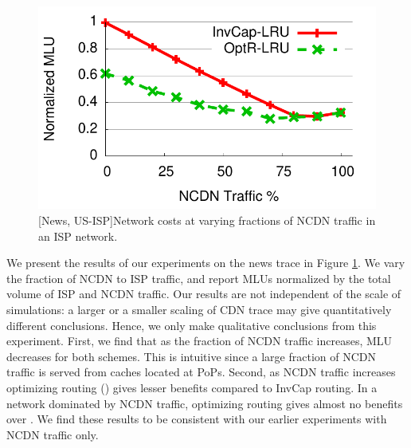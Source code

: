 \begin{figure}
\begin{center}
\includegraphics[scale=0.4]{graphset1/ispncdn/ATTNews-99percentile.pdf}
\vspace{-0.25in}
\end{center}
\caption{[News, US-ISP]Network costs at varying fractions of NCDN traffic in an ISP network.}
\label{fig:ispncdn}
\vspace{-0.2in}
\end{figure}

We present the results of our experiments on the news trace in Figure \ref{fig:ispncdn}. We vary the fraction of NCDN to ISP traffic, and report MLUs normalized by the total volume of ISP and NCDN traffic.
Our results are not independent of the scale of simulations: a larger or a smaller scaling of CDN trace may give quantitatively different conclusions. Hence, we only make qualitative conclusions from this experiment. First, we find that as the fraction of NCDN traffic increases, MLU decreases for both schemes. This is intuitive since a large fraction of NCDN traffic is served from caches located at PoPs. Second, as NCDN traffic increases optimizing routing (\optlru) gives lesser benefits compared to InvCap routing.  In a network dominated by NCDN traffic, optimizing routing gives almost no benefits over \invlru. We find these results to be consistent with our earlier experiments with NCDN traffic only.


